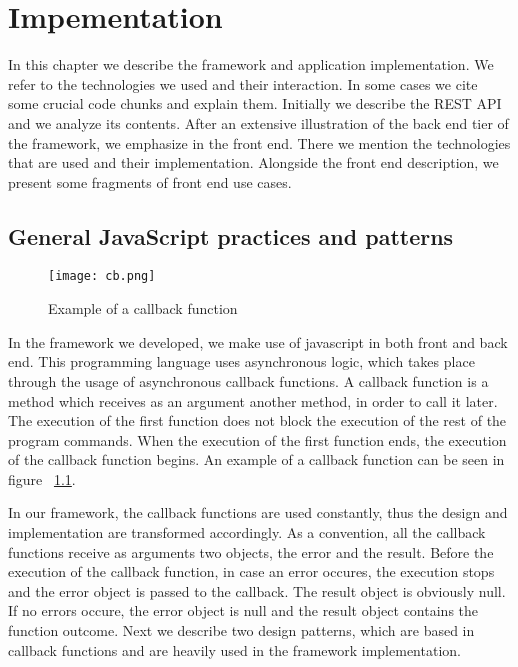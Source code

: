 
\chapter{Impementation}
In this chapter we describe the framework and application implementation. We refer to the technologies we used and their interaction. In some cases we cite some crucial code chunks and explain them. Initially we describe the REST API and we analyze its contents. After an extensive illustration of the back end tier of the framework, we emphasize in the front end. There we mention the technologies that are used and their implementation. Alongside the front end description, we present some fragments of front end use cases.

\section{General JavaScript practices and patterns}
\begin{figure}
	\texttt{[image: cb.png]}
	\caption{Example of a callback function}
	\label{cb}
\end{figure} 
In the framework we developed, we make use of javascript in both front and back end. This programming language uses asynchronous logic, which takes place through the usage of asynchronous callback functions. A callback function is a method which receives as an argument another method, in order to call it later. The execution of the first function does not block the execution of the rest of the program commands. When the execution of the first function ends, the execution of the callback function begins. An example of a callback function can be seen in figure ~\ref{cb}. \par
	In our framework, the callback functions are used constantly, thus the design and implementation are transformed accordingly. As a convention, all the callback functions receive as arguments two objects, the error and the result. Before the execution of the callback function, in case an error occures, the execution stops and the error object is passed to the callback. The result object is obviously null. If no errors occure, the error object is null and the result object contains the function outcome. Next we describe two design patterns, which are based in callback functions and are heavily used in the framework implementation.

